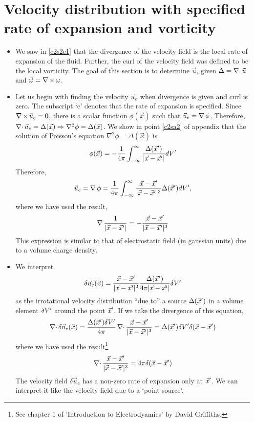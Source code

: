 \section{Velocity distribution with specified rate of expansion and vorticity}\label{c2s4}
\begin{itemize}
\item We saw in \eqref{c2s2e1} that the divergence of the velocity field is the local rate of expansion of the fluid. Further, the curl of the velocity field was defined to be the
local vorticity. The goal of this section is to determine $\vec{u}$, given $\Delta = \operatorname{\nabla\cdot}{\vec{u}}$ and $\vec{\omega} = \operatorname{\nabla\operatorname{\times}}{\omega}$.

\item Let us begin with finding the velocity $\vec{u}_e$ when divergence is given and curl is zero. The subscript \enquote*{e} denotes that the rate of expansion is specified. Since 
$\operatorname{\nabla\operatorname{\times}}{\vec{u}_e} = 0$, there is a scalar function $\phi(\vec{x})$ such that $\vec{u}_e = \operatorname{\nabla}{\phi}$. Therefore, $\operatorname{\nabla\cdot}{\vec{u}_e} = \Delta(\vec{x}) \Rightarrow \nabla^2\phi =
 \Delta(\vec{x})$. We show in point \ref{c2sa2} of appendix that the solution of Poisson's equation $\nabla^2\phi = \Delta(\vec{x})$ is
\[
\phi(\vec{x}) = - \frac{1}{4\pi}\int_{-\infty}^{\infty}\frac{\Delta(\vec{x}^\prime)}{|\vec{x}-\vec{x}^\prime|} dV^\prime
\]
Therefore, 
\[
\vec{u}_e = \operatorname{\nabla}{\phi} = \frac{1}{4\pi}\int_{-\infty}^{\infty} \frac{\vec{x} - \vec{x}^\prime}{|\vec{x}-\vec{x}^\prime|^3}\Delta(\vec{x}^\prime)dV^\prime,
\]
where we have used the result,
\[
\operatorname{\nabla}\frac{1}{|\vec{x}-\vec{x}^\prime|} = -\frac{\vec{x} - \vec{x}^\prime}{|\vec{x}-\vec{x}^\prime|^3}
\]
This expression is similar to that of electrostatic field (in gaussian units) due to a volume charge density.

\item We interpret
\[
\delta\vec{u}_e(\vec{x}) = \frac{\vec{x} - \vec{x}^\prime}{|\vec{x}-\vec{x}^\prime|^2}\frac{\Delta(\vec{x}^\prime)}{4\pi|\vec{x}-\vec{x}^\prime|}\delta V^\prime
\]
as the irrotational velocity distribution \enquote{due to} a source $\Delta(\vec{x}^\prime)$ in a volume element $\delta V^\prime$ around the point $\vec{x}^\prime$. If we take the divergence
of this equation,
\[
\operatorname{\nabla\cdot}{\delta\vec{u}_e(\vec{x})} = \frac{\Delta(\vec{x}^\prime)\delta V^\prime}{4\pi}\operatorname{\nabla\cdot}{\frac{\vec{x} - \vec{x}^\prime}{|\vec{x}-\vec{x}^\prime|^3}} = 
\Delta(\vec{x}^\prime)\delta V^\prime \delta(\vec{x} - \vec{x}^\prime)
\]
where we have used the result\footnote{See chapter 1 of 'Introduction to Electrodyamics' by David Griffiths\cite{griffiths1999introduction}.}
\[
\operatorname{\nabla\cdot}{\frac{\vec{x} - \vec{x}^\prime}{|\vec{x}-\vec{x}^\prime|^3}} = 4\pi\delta(\vec{x} - \vec{x}^\prime)
\]
The velocity field $\delta\vec{u}_e$ has a non-zero rate of expansion only at $\vec{x}^\prime$. We can interpret it like the velocity field due to a \enquote*{point source}.


\end{itemize}
